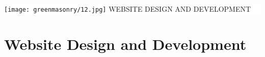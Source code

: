 \documentclass[35pt]{report}
\begin{document}

\thispagestyle{empty}

\vspace*{2cm}
\colorbox{white}{
	\parbox[t]{1.0\linewidth}{
       	\begin{center} 
			\fontsize{40pt}{11pt}\selectfont 
			\vspace*{.5cm}
				{\texttt{[image: greenmasonry/12.jpg]}}
				{WEBSITE DESIGN AND DEVELOPMENT}
			\vspace*{.5cm}
		\end{center}
	}
}


\clearpage

\normalsize

\chapter{Website Design and Development}
		
\end{document}
